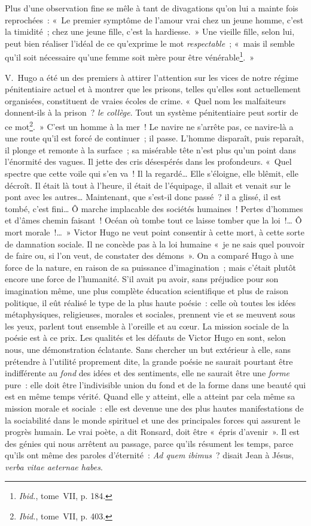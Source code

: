 \documentclass[french,twoside]{book} %
\newcommand\chapterclose{} %
\begin{document}
\noindent Plus d’une observation fine se mêle à tant de divagations qu’on lui a mainte fois reprochées : « Le premier symptôme de l’amour vrai chez un jeune homme, c’est la timidité ; chez une jeune fille, c’est la hardiesse. » Une vieille fille, selon lui, peut bien réaliser l’idéal de ce qu’exprime le mot \emph{respectable} ; « mais il semble qu’il soit nécessaire qu’une femme soit mère pour être vénérable\footnote{\emph{Ibid.}, tome VII, p. 184.}. »\par
V. Hugo a été un des premiers à attirer l’attention sur les vices de notre régime pénitentiaire actuel et à montrer que les prisons, telles qu’elles sont actuellement organisées, constituent de vraies écoles de crime. « Quel nom les malfaiteurs donnent-ils à la prison ? \emph{le collège}. Tout un système pénitentiaire peut sortir de ce mot\footnote{\emph{Ibid.}, tome VII, p. 403.}. » C’est un homme à la mer ! Le navire ne s’arrête pas, ce navire-là a une route qu’il est forcé de continuer ; il passe. L’homme disparaît, puis reparaît, il plonge et remonte à la surface ; sa misérable tête n’est plus qu’un point dans l’énormité des vagues. Il jette des cris désespérés dans les profondeurs. « Quel spectre que cette voile qui s’en va ! Il la regardé… Elle s’éloigne, elle blêmit, elle décroît. Il était là tout à l’heure, il était de l’équipage, il allait et venait sur le pont avec les autres… Maintenant, que s’est-il donc passé ? il a glissé, il est tombé, c’est fini… Ô marche implacable des sociétés humaines ! Pertes d’hommes et d’âmes chemin faisant ! Océan où tombe tout ce laisse tomber que la loi !… Ô mort morale !… » Victor Hugo ne veut point consentir à cette mort, à cette sorte de damnation sociale. Il ne concède pas à la loi humaine « je ne sais quel pouvoir de faire ou, si l’on veut, de constater des démons ». On a comparé Hugo à une force de la nature, en raison de sa puissance d’imagination ; mais c’était plutôt encore une force de l’humanité. S’il avait pu avoir, sans préjudice pour son imagination même, une plus complète éducation scientifique et plus de raison politique, il eût réalisé le type de la plus haute poésie : celle où toutes les idées métaphysiques, religieuses, morales et sociales, prennent vie et se meuvent sous les yeux, parlent tout ensemble à l’oreille et au cœur. La mission sociale de la poésie est à ce prix. Les qualités et les défauts de Victor Hugo en sont, selon nous, une démonstration éclatante. Sans chercher un but extérieur à elle, sans prétendre à l’utilité proprement dite, la grande poésie ne saurait pourtant être indifférente au \emph{fond} des idées et des sentiments, elle ne saurait être une \emph{forme} pure : elle doit être l’indivisible union du fond et de la forme dans une beauté qui est en même temps vérité. Quand elle y atteint, elle a atteint par cela même sa mission morale et sociale : elle est devenue une des plus hautes manifestations de la sociabilité dans le monde spirituel et une des principales forces qui assurent le progrès humain. Le vrai poète, a dit Ronsard, doit être « épris d’avenir ». Il est des génies qui nous arrêtent au passage, parce qu’ils résument les temps, parce qu’ils ont même des paroles d’éternité : \emph{Ad quem ibimus} ? disait Jean à Jésus, \emph{verba vitae aeternae habes}.
\chapterclose
\end{document}
